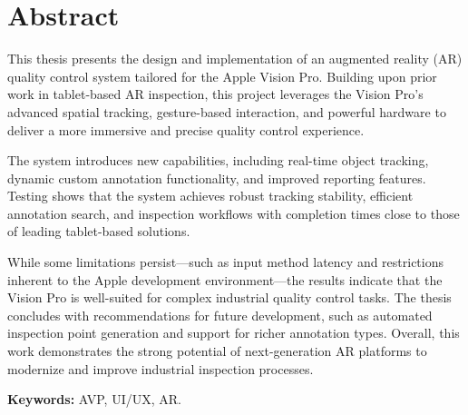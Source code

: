 \chapter*{Abstract}


This thesis presents the design and implementation of an augmented reality (AR) quality control system tailored for the Apple Vision Pro. Building upon prior work in tablet-based AR inspection, this project leverages the Vision Pro’s advanced spatial tracking, gesture-based interaction, and powerful hardware to deliver a more immersive and precise quality control experience.

The system introduces new capabilities, including real-time object tracking, dynamic custom annotation functionality, and improved reporting features. Testing shows that the system achieves robust tracking stability, efficient annotation search, and inspection workflows with completion times close to those of leading tablet-based solutions.

While some limitations persist—such as input method latency and restrictions inherent to the Apple development environment—the results indicate that the Vision Pro is well-suited for complex industrial quality control tasks. The thesis concludes with recommendations for future development, such as automated inspection point generation and support for richer annotation types. Overall, this work demonstrates the strong potential of next-generation AR platforms to modernize and improve industrial inspection processes.

\vfill
\textbf{Keywords:} AVP, UI/UX, AR.
\clearpage